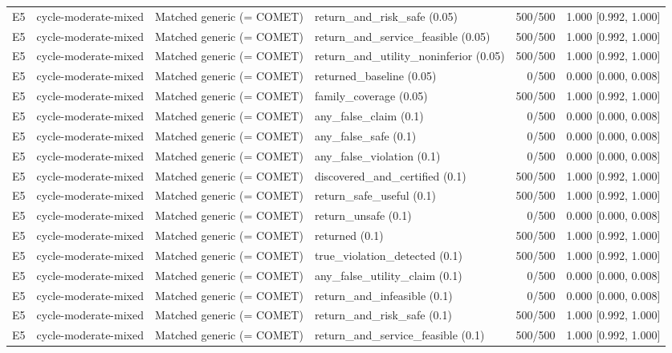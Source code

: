 \begin{longtable}{p{.04\linewidth}p{.18\linewidth}p{.19\linewidth}p{.16\linewidth}r p{.21\linewidth}}
E5 & cycle-moderate-mixed & Matched generic (= COMET) & return\_and\_risk\_safe (0.05) & 500/500 & 1.000 [0.992, 1.000]\\
E5 & cycle-moderate-mixed & Matched generic (= COMET) & return\_and\_service\_feasible (0.05) & 500/500 & 1.000 [0.992, 1.000]\\
E5 & cycle-moderate-mixed & Matched generic (= COMET) & return\_and\_utility\_noninferior (0.05) & 500/500 & 1.000 [0.992, 1.000]\\
E5 & cycle-moderate-mixed & Matched generic (= COMET) & returned\_baseline (0.05) & 0/500 & 0.000 [0.000, 0.008]\\
E5 & cycle-moderate-mixed & Matched generic (= COMET) & family\_coverage (0.05) & 500/500 & 1.000 [0.992, 1.000]\\
E5 & cycle-moderate-mixed & Matched generic (= COMET) & any\_false\_claim (0.1) & 0/500 & 0.000 [0.000, 0.008]\\
E5 & cycle-moderate-mixed & Matched generic (= COMET) & any\_false\_safe (0.1) & 0/500 & 0.000 [0.000, 0.008]\\
E5 & cycle-moderate-mixed & Matched generic (= COMET) & any\_false\_violation (0.1) & 0/500 & 0.000 [0.000, 0.008]\\
E5 & cycle-moderate-mixed & Matched generic (= COMET) & discovered\_and\_certified (0.1) & 500/500 & 1.000 [0.992, 1.000]\\
E5 & cycle-moderate-mixed & Matched generic (= COMET) & return\_safe\_useful (0.1) & 500/500 & 1.000 [0.992, 1.000]\\
E5 & cycle-moderate-mixed & Matched generic (= COMET) & return\_unsafe (0.1) & 0/500 & 0.000 [0.000, 0.008]\\
E5 & cycle-moderate-mixed & Matched generic (= COMET) & returned (0.1) & 500/500 & 1.000 [0.992, 1.000]\\
E5 & cycle-moderate-mixed & Matched generic (= COMET) & true\_violation\_detected (0.1) & 500/500 & 1.000 [0.992, 1.000]\\
E5 & cycle-moderate-mixed & Matched generic (= COMET) & any\_false\_utility\_claim (0.1) & 0/500 & 0.000 [0.000, 0.008]\\
E5 & cycle-moderate-mixed & Matched generic (= COMET) & return\_and\_infeasible (0.1) & 0/500 & 0.000 [0.000, 0.008]\\
E5 & cycle-moderate-mixed & Matched generic (= COMET) & return\_and\_risk\_safe (0.1) & 500/500 & 1.000 [0.992, 1.000]\\
E5 & cycle-moderate-mixed & Matched generic (= COMET) & return\_and\_service\_feasible (0.1) & 500/500 & 1.000 [0.992, 1.000]\\

\end{longtable}

